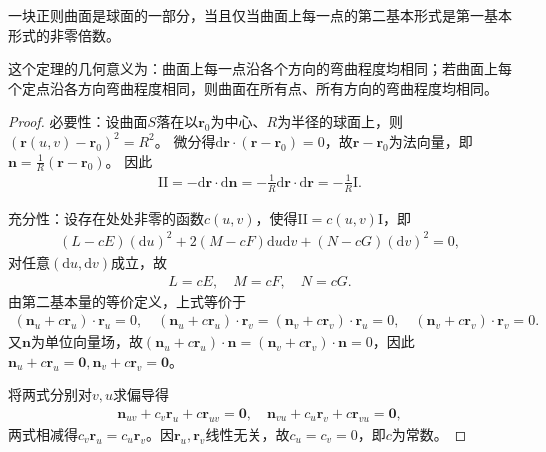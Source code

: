 \documentclass[../../main.tex]{subfiles}%
\begin{document}
\begin{theorem}
一块正则曲面是球面的一部分，当且仅当曲面上每一点的第二基本形式是第一基本形式的非零倍数。
\end{theorem}
\begin{remark}
这个定理的几何意义为：曲面上每一点沿各个方向的弯曲程度均相同；若曲面上每个定点沿各方向弯曲程度相同，则曲面在所有点、所有方向的弯曲程度均相同。
\end{remark}
\begin{proof}

必要性：设曲面$S$落在以$\boldsymbol{r}_0$为中心、$R$为半径的球面上，则$(\boldsymbol{r}(u,v)-\boldsymbol{r}_0)^2=R^2$。
微分得$\mathrm{d}\boldsymbol{r}\cdot(\boldsymbol{r}-\boldsymbol{r}_0)=0$，故$\boldsymbol{r}-\boldsymbol{r}_0$为法向量，即$\boldsymbol{n}=\frac{1}{R}(\boldsymbol{r}-\boldsymbol{r}_0)$。
因此
\begin{align*}
\mathrm{II}=-\mathrm{d}\boldsymbol{r}\cdot\mathrm{d}\boldsymbol{n}=-\frac{1}{R}\mathrm{d}\boldsymbol{r}\cdot\mathrm{d}\boldsymbol{r}=-\frac{1}{R}\mathrm{I}.
\end{align*}

充分性：设存在处处非零的函数$c(u,v)$，使得$\mathrm{II}=c(u,v)\mathrm{I}$，即
\begin{align*}
(L-cE)(\mathrm{d}u)^2+2(M-cF)\mathrm{d}u\mathrm{d}v+(N-cG)(\mathrm{d}v)^2=0,
\end{align*}
对任意$(\mathrm{d}u,\mathrm{d}v)$成立，故
\begin{align*}
L=cE,\quad M=cF,\quad N=cG.
\end{align*}
由第二基本量的等价定义，上式等价于
\begin{align*}
(\boldsymbol{n}_u+c\boldsymbol{r}_u)\cdot\boldsymbol{r}_u=0,\quad (\boldsymbol{n}_u+c\boldsymbol{r}_u)\cdot\boldsymbol{r}_v=(\boldsymbol{n}_v+c\boldsymbol{r}_v)\cdot\boldsymbol{r}_u=0,\quad (\boldsymbol{n}_v+c\boldsymbol{r}_v)\cdot\boldsymbol{r}_v=0.
\end{align*}
又$\boldsymbol{n}$为单位向量场，故$(\boldsymbol{n}_u+c\boldsymbol{r}_u)\cdot\boldsymbol{n}=(\boldsymbol{n}_v+c\boldsymbol{r}_v)\cdot\boldsymbol{n}=0$，因此$\boldsymbol{n}_u+c\boldsymbol{r}_u=\boldsymbol{0},\boldsymbol{n}_v+c\boldsymbol{r}_v=\boldsymbol{0}$。

将两式分别对$v,u$求偏导得
\begin{align*}
\boldsymbol{n}_{uv}+c_v\boldsymbol{r}_u+c\boldsymbol{r}_{uv}=\boldsymbol{0},\quad \boldsymbol{n}_{vu}+c_u\boldsymbol{r}_v+c\boldsymbol{r}_{vu}=\boldsymbol{0},
\end{align*}
两式相减得$c_v\boldsymbol{r}_u=c_u\boldsymbol{r}_v$。因$\boldsymbol{r}_u,\boldsymbol{r}_v$线性无关，故$c_u=c_v=0$，即$c$为常数。


\end{proof}
\end{document}
